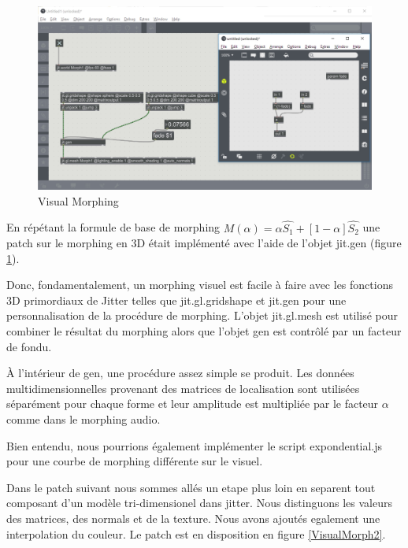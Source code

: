     \begin{figure}
        \centering
        \includegraphics[width = \textwidth ]{Graphs/Morphing_patch.jpg}
        \caption{Visual Morphing}
        \label{VisualMorph}
    \end{figure}


En répétant la formule de base de morphing $M(\alpha) = \alpha\widehat {S_1} + [1 -\alpha]\widehat {S_2} $ une patch sur le morphing en 3D était implémenté avec l'aide de l'objet jit.gen (figure \ref{VisualMorph}).

Donc, fondamentalement, un morphing visuel est facile à faire avec les fonctions 3D primordiaux de Jitter telles que jit.gl.gridshape et jit.gen pour une personnalisation de la procédure de morphing. L'objet jit.gl.mesh est utilisé pour combiner le résultat du morphing alors que l'objet gen est contrôlé par un facteur de fondu.

À l'intérieur de gen, une procédure assez simple se produit. Les données multidimensionnelles provenant des matrices de localisation sont utilisées séparément pour chaque forme et leur amplitude est multipliée par le facteur $\alpha$ comme dans le morphing audio.

Bien entendu, nous pourrions également implémenter le script expondential.js pour une courbe de morphing différente sur le visuel.

Dans le patch suivant nous sommes allés un etape plus loin en separent tout composant d'un modèle tri-dimensionel dans jitter. Nous distinguons les valeurs des matrices, des normals et de la texture. Nous avons ajoutés egalement une interpolation du couleur. Le patch est en disposition en figure \ref{VisualMorph2}.

